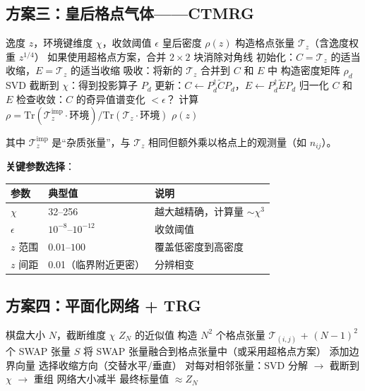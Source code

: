 \documentclass[12pt,a4paper]{ctexart}
\begin{document}
\subsection{方案三：皇后格点气体——CTMRG}

\begin{algorithm}[H]
\caption{CTMRG 计算皇后格点气体}
\begin{algorithmic}[1]
\REQUIRE 逸度 $z$，环境键维度 $\chi$，收敛阈值 $\epsilon$
\ENSURE 皇后密度 $\rho(z)$
\STATE 构造格点张量 $\mathcal{T}_z$（含逸度权重 $z^{1/4}$）
\STATE 如果使用超格点方案，合并 $2 \times 2$ 块消除对角线
\STATE 初始化：$C = \mathcal{T}_z$ 的适当收缩，$E = \mathcal{T}_z$ 的适当收缩
\REPEAT
        \STATE 吸收：将新的 $\mathcal{T}_z$ 合并到 $C$ 和 $E$ 中
        \STATE 构造密度矩阵 $\rho_d$
        \STATE SVD 截断到 $\chi$：得到投影算子 $P_d$
        \STATE 更新：$C \leftarrow P_d^\dagger \widetilde{C} P_d$，$E \leftarrow P_d^\dagger \widetilde{E} P_d$
        \STATE 归一化 $C$ 和 $E$
    \ENDFOR
    \STATE 检查收敛：$C$ 的奇异值谱变化 $< \epsilon$？
\STATE 计算 $\rho = \text{Tr}(\mathcal{T}_z^{\text{imp}} \cdot \text{环境}) / \text{Tr}(\mathcal{T}_z \cdot \text{环境})$
\RETURN $\rho(z)$
\end{algorithmic}
\end{algorithm}

其中 $\mathcal{T}_z^{\text{imp}}$ 是``杂质张量''，与 $\mathcal{T}_z$ 相同但额外乘以格点上的观测量（如 $n_{ij}$）。

\textbf{关键参数选择}：
\begin{center}
\begin{tabular}{lll}
\toprule
参数 & 典型值 & 说明 \\
\midrule
$\chi$ & 32--256 & 越大越精确，计算量 $\sim \chi^3$ \\
$\epsilon$ & $10^{-8}$--$10^{-12}$ & 收敛阈值 \\
$z$ 范围 & $0.01$--$100$ & 覆盖低密度到高密度 \\
$z$ 间距 & 0.01（临界附近更密） & 分辨相变 \\
\bottomrule
\end{tabular}
\end{center}

\subsection{方案四：平面化网络 + TRG}

\begin{algorithm}[H]
\caption{平面化 + TRG 计算 $Z_N$}
\begin{algorithmic}[1]
\REQUIRE 棋盘大小 $N$，截断维度 $\chi$
\ENSURE $Z_N$ 的近似值
\STATE 构造 $N^2$ 个格点张量 $\mathcal{T}_{(i,j)}$ + $(N-1)^2$ 个 SWAP 张量 $S$
\STATE 将 SWAP 张量融合到格点张量中（或采用超格点方案）
\STATE 添加边界向量
    \STATE 选择收缩方向（交替水平/垂直）
    \STATE 对每对相邻张量：SVD 分解 $\to$ 截断到 $\chi$ $\to$ 重组
    \STATE 网络大小减半
\ENDWHILE
\RETURN 最终标量值 $\approx Z_N$
\end{algorithmic}
\end{algorithm}
\end{document}
